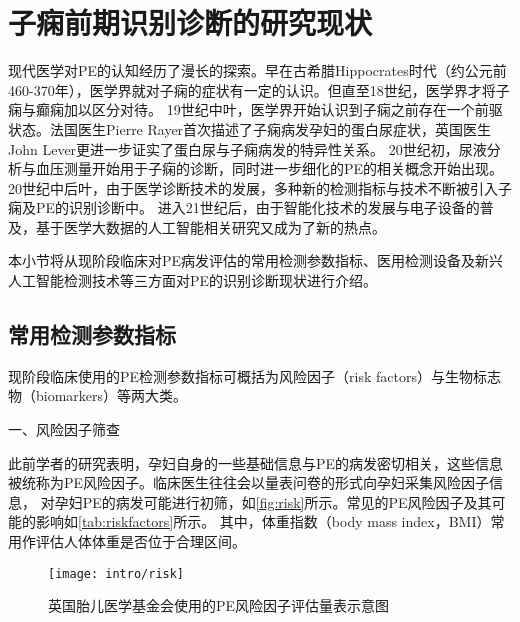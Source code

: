 \section{子痫前期识别诊断的研究现状}
现代医学对PE的认知经历了漫长的探索\cite{BJOG2016}。早在古希腊Hippocrates时代（约公元前460-370年），医学界就对子痫的症状有一定的认识。但直至18世纪，医学界才将子痫与癫痫加以区分对待。
19世纪中叶，医学界开始认识到子痫之前存在一个前驱状态。法国医生Pierre Rayer首次描述了子痫病发孕妇的蛋白尿症状，英国医生John Lever更进一步证实了蛋白尿与子痫病发的特异性关系。
20世纪初，尿液分析与血压测量开始用于子痫的诊断，同时进一步细化的PE的相关概念开始出现。20世纪中后叶，由于医学诊断技术的发展，多种新的检测指标与技术不断被引入子痫及PE的识别诊断中。
进入21世纪后，由于智能化技术的发展与电子设备的普及，基于医学大数据的人工智能相关研究又成为了新的热点。

本小节将从现阶段临床对PE病发评估的常用检测参数指标、医用检测设备及新兴人工智能检测技术等三方面对PE的识别诊断现状进行介绍。

\subsection{常用检测参数指标}
现阶段临床使用的PE检测参数指标可概括为风险因子（risk factors）与生物标志物（biomarkers）等两大类。

一、风险因子筛查

此前学者的研究表明，孕妇自身的一些基础信息与PE的病发密切相关，这些信息被统称为PE风险因子\cite{Magee2008,FIGO,Lowe2015,Heazell2010}。临床医生往往会以量表问卷的形式向孕妇采集风险因子信息，
对孕妇PE的病发可能进行初筛\cite{risks}，如\autoref{fig:risk}所示。常见的PE风险因子及其可能的影响如\autoref{tab:riskfactors}所示。
其中，体重指数（body mass index，BMI）常用作评估人体体重是否位于合理区间。
\begin{figure}[ht]
    \centering
    \texttt{[image: intro/risk]}
    \caption[英国胎儿医学基金会使用的PE风险因子评估量表示意图]{\label{fig:risk}英国胎儿医学基金会使用的PE风险因子评估量表示意图\cite{risks}}
\end{figure}


